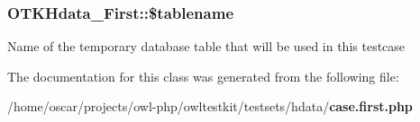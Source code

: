 \subsubsection[{\$tablename}]{\setlength{\rightskip}{0pt plus 5cm}OTKHdata\_\-First::\$tablename\hspace{0.3cm}{\ttfamily  [private]}}\label{classOTKHdata__First_a9dc7c3a7b777b7a142fdb67c4793b7fa}
Name of the temporary database table that will be used in this testcase 

The documentation for this class was generated from the following file:\begin{DoxyCompactItemize}
\item 
/home/oscar/projects/owl-\/php/owltestkit/testsets/hdata/{\bf case.first.php}\end{DoxyCompactItemize}
